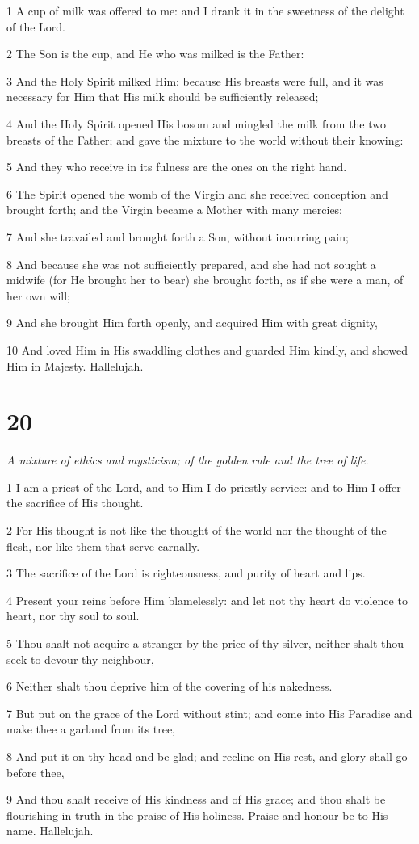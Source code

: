 \par 1 A cup of milk was offered to me: and I drank it in the sweetness of the delight of the Lord.
\par 2 The Son is the cup, and He who was milked is the Father:
\par 3 And the Holy Spirit milked Him: because His breasts were full, and it was necessary for Him that His milk should be sufficiently released;
\par 4 And the Holy Spirit opened His bosom and mingled the milk from the two breasts of the Father; and gave the mixture to the world without their knowing:
\par 5 And they who receive in its fulness are the ones on the right hand.
\par 6 The Spirit opened the womb of the Virgin and she received conception and brought forth; and the Virgin became a Mother with many mercies;
\par 7 And she travailed and brought forth a Son, without incurring pain;
\par 8 And because she was not sufficiently prepared, and she had not sought a midwife (for He brought her to bear) she brought forth, as if she were a man, of her own will;
\par 9 And she brought Him forth openly, and acquired Him with great dignity,
\par 10 And loved Him in His swaddling clothes and guarded Him kindly, and showed Him in Majesty. Hallelujah.

\chapter{20}

\par \textit{A mixture of ethics and mysticism; of the golden rule and the tree of life.}

\par 1 I am a priest of the Lord, and to Him I do priestly service: and to Him I offer the sacrifice of His thought.
\par 2 For His thought is not like the thought of the world nor the thought of the flesh, nor like them that serve carnally.
\par 3 The sacrifice of the Lord is righteousness, and purity of heart and lips.
\par 4 Present your reins before Him blamelessly: and let not thy heart do violence to heart, nor thy soul to soul.
\par 5 Thou shalt not acquire a stranger by the price of thy silver, neither shalt thou seek to devour thy neighbour,
\par 6 Neither shalt thou deprive him of the covering of his nakedness.
\par 7 But put on the grace of the Lord without stint; and come into His Paradise and make thee a garland from its tree,
\par 8 And put it on thy head and be glad; and recline on His rest, and glory shall go before thee,
\par 9 And thou shalt receive of His kindness and of His grace; and thou shalt be flourishing in truth in the praise of His holiness. Praise and honour be to His name. Hallelujah.


